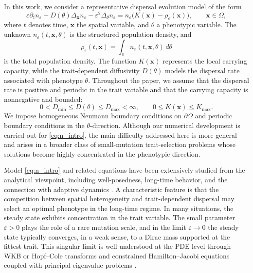 \documentclass[11pt]{article}
\begin{document}
In this work, we consider a representative dispersal evolution model of the form
\begin{equation}\label{eq:n_intro}
    \varepsilon \partial_t n_\varepsilon
    -D(\theta)\Delta_\mathbf{x} n_\varepsilon
    -\varepsilon^2\Delta_\theta n_\varepsilon
    =
    n_\varepsilon\bigl(K(\mathbf{x})-\rho_\varepsilon(\mathbf{x})\bigr),
    \qquad \mathbf{x}\in\Omega,
\end{equation}
where $t$ denotes time, $\mathbf{x}$ the spatial variable, and $\theta$ a phenotypic variable. The unknown $n_\varepsilon(t,\mathbf{x},\theta)$ is the structured population density, and
\[
\rho_\varepsilon(t,\mathbf{x})
=
\int_{\mathbb T} n_\varepsilon(t,\mathbf{x},\theta)\,d\theta
\]
is the total population density. The function $K(\mathbf{x})$ represents the local carrying capacity, while the trait-dependent diffusivity $D(\theta)$ models the dispersal rate associated with phenotype $\theta$. 
Throughout the paper, we assume that the dispersal rate is positive and periodic in the trait variable and that the carrying capacity is nonnegative and bounded:
\begin{equation}\label{eq:basic_assumptions}
    0<D_{\min}\le D(\theta)\le D_{\max}<\infty,
    \qquad
    0\le K(\mathbf{x})\le K_{\max}.
\end{equation}
We impose homogeneous Neumann boundary conditions on $\partial\Omega$ and periodic boundary conditions in the $\theta$-direction. Although our numerical development is carried out for \eqref{eq:n_intro}, the main difficulty addressed here is more general and arises in a broader class of small-mutation trait-selection problems whose solutions become highly concentrated in the phenotypic direction.

Model \eqref{eq:n_intro} and related equations have been extensively studied from the analytical viewpoint, including well-posedness, long-time behavior, and the connection with adaptive dynamics \cite{MirrahimiPerthame,PerthameSouganidis,AlmeidaPerthameRuan}. A characteristic feature is that the competition between spatial heterogeneity and trait-dependent dispersal may select an optimal phenotype in the long-time regime. In many situations, the steady state exhibits concentration in the trait variable. The small parameter $\varepsilon>0$ plays the role of a rare mutation scale, and in the limit $\varepsilon\to0$ the steady state typically converges, in a weak sense, to a Dirac mass supported at the fittest trait. This singular limit is well understood at the PDE level through WKB or Hopf--Cole transforms and constrained Hamilton--Jacobi equations coupled with principal eigenvalue problems \cite{PerthameSouganidis,BarlesPerthame,MirrahimiPerthame}.
\end{document}
